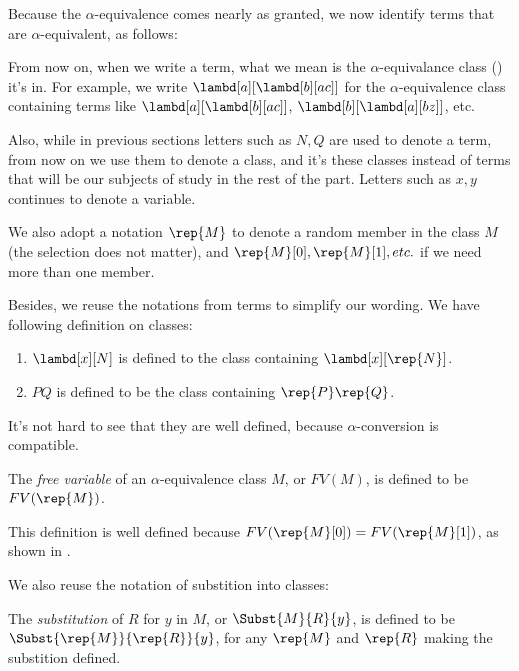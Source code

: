\documentclass[../../../include/open-logic-section]{subfiles}
\begin{document}

Because the $\alpha$-equivalence comes nearly as granted, we now
identify terms that are $\alpha$-equivalent, as follows:

From now on, when we write a term, what we mean is the
$\alpha$-equivalance class () it's in. For
example, we write $\lambd[a][\lambd[b][a c]]$ for the
$\alpha$-equivalence class containing terms like
$\lambd[a][\lambd[b][a c]]$, $\lambd[b][\lambd[a][b z]]$, etc.

Also, while in previous sections letters such as $N, Q$ are used to
denote a term, from now on we use them to denote a class,
and it's these classes instead of terms that
will be our subjects of study in the rest of the part. Letters such as
$x, y$ continues to denote a variable.

We also adopt a notation $\rep{M}$ to denote a random member in the
class $M$ (the selection does not matter), and $\rep{M}[0], \rep{M}[1], etc. $ if we need more than
one member.

Besides, we reuse the notations from terms to simplify our wording. We
have following definition on classes:
\begin{defn}
  \begin{enumerate}
  \item $\lambd[x][N]$ is defined to the class containing
    $\lambd[x][\rep{N}]$.
  \item $PQ$ is defined to be the class containing $\rep{P}\rep{Q}$.
  \end{enumerate}
\end{defn}

It's not hard to see that they are well defined, because
$\alpha$-conversion is compatible.

\begin{defn} 
  The \emph{free variable} of an $\alpha$-equivalence class $M$, or $FV(M)$, is defined to be $FV(\rep{M})$.
\end{defn}

This definition is well defined because $FV(\rep{M}[0]) = FV(\rep{M}[1])$, as shown in .

We also reuse the notation of substition into classes:
\begin{defn} 
  The \emph{substitution} of $R$ for $y$ in $M$, or $\Subst{M}{R}{y}$, is
  defined to be $\Subst{\rep{M}}{\rep{R}}{y}$, for any $\rep{M}$ and
  $\rep{R}$ making the substition defined.
\end{defn}
\end{document}

